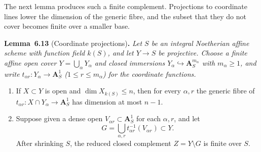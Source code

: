 \documentclass[11pt]{article}
\newenvironment{bpstatement}[2]{\par\addvspace{0.6\baselineskip}\noindent\textbf{#1}#2\textbf{.}\enspace\ignorespaces}
  {\par\addvspace{0.4\baselineskip}}
\newenvironment{bpstatementit}[2]{\begin{bpstatement}{#1}{#2}\itshape\ignorespaces}{\end{bpstatement}}
\begin{document}
\label{bp40}%
The next lemma produces such a finite complement. Projections to coordinate lines lower the dimension of the generic fibre, and the subset that they do not cover becomes finite over a smaller base.

\label{bp41}%
\begin{bpstatementit}{Lemma~6.13}{ (Coordinate projections)}
Let \(S\) be an integral Noetherian affine scheme with function field \(k(S)\), and let \(Y\to S\) be projective. Choose a finite affine open cover \(Y=\bigcup_\alpha Y_\alpha\) and closed immersions \(Y_\alpha\hookrightarrow\mathbf A^{m_\alpha}_S\) with \(m_\alpha\geq1\), and write \(t_{\alpha r}:Y_\alpha\to\mathbf A^1_S\) (\(1\le r\le m_\alpha\)) for the coordinate functions.

\begin{enumerate}
\item If \(X\subset Y\) is open and \(\dim X_{k(S)}\leq n\), then for every \(\alpha,r\) the generic fibre of \(t_{\alpha r}:X\cap Y_\alpha\to\mathbf A^1_S\) has dimension at most \(n-1\).
\item Suppose given a dense open \(V_{\alpha r}\subset\mathbf A^1_S\) for each \(\alpha,r\), and let \[
   G=\bigcup_{\alpha,r}
   t_{\alpha r}^{-1}(V_{\alpha r})\subset Y.
   \] After shrinking \(S\), the reduced closed complement \(Z=Y\setminus G\) is finite over \(S\).
\end{enumerate}
\end{bpstatementit}
\end{document}
